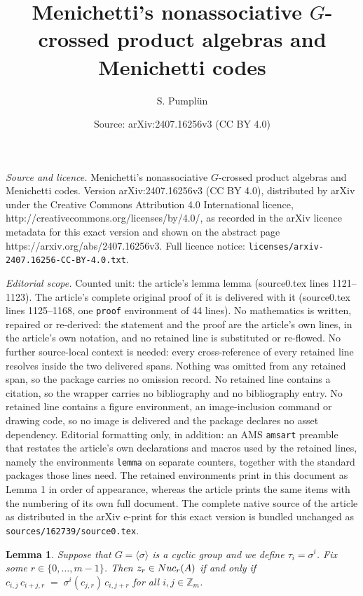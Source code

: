 \documentclass[10pt,a4paper]{amsart}
\title{Menichetti's nonassociative $G$-crossed product algebras and Menichetti codes}
\author{S. Pumpl\"un}
\date{Source: arXiv:2407.16256v3 (CC BY 4.0)}
\newtheorem{lemma}{Lemma}
\begin{document}
\maketitle

\noindent\emph{Source and licence.} Menichetti's nonassociative $G$-crossed product algebras and Menichetti codes. Version arXiv:2407.16256v3 (CC BY 4.0), distributed by arXiv under the Creative Commons Attribution 4.0 International licence, http://creativecommons.org/licenses/by/4.0/, as recorded in the arXiv licence metadata for this exact version and shown on the abstract page https://arxiv.org/abs/2407.16256v3. Full licence notice: \texttt{licenses/arxiv-2407.16256-CC-BY-4.0.txt}.\par\smallskip

\noindent\textit{Editorial scope.} Counted unit: the article's lemma lemma (source0.tex lines 1121--1123). The article's complete original proof of it is delivered with it (source0.tex lines 1125--1168, one \texttt{proof} environment of 44 lines). No mathematics is written, repaired or re-derived: the statement and the proof are the article's own lines, in the article's own notation, and no retained line is substituted or re-flowed.  No further source-local context is needed: every cross-reference of every retained line resolves inside the two delivered spans.  Nothing was omitted from any retained span, so the package carries no omission record.  No retained line contains a citation, so the wrapper carries no bibliography and no bibliography entry.  No retained line contains a figure environment, an image-inclusion command or drawing code, so no image is delivered and the package declares no asset dependency.  Editorial formatting only, in addition: an AMS \texttt{amsart} preamble that restates the article's own declarations and macros used by the retained lines, namely the environments \texttt{lemma} on separate counters, together with the standard packages those lines need.  The retained environments print in this document as Lemma 1 in order of appearance, whereas the article prints the same items with the numbering of its own full document.  The complete native source of the article as distributed in the arXiv e-print for this exact version is bundled unchanged as \texttt{sources/162739/source0.tex}.
\begin{lemma} Suppose that $G=\langle \sigma\rangle$ is a cyclic group and we define $\tau_i=\sigma^i$.
Fix some  $r\in \{0,\dots,m-1\}$. Then $z_r\in {\rm Nuc}_r(A)$ if and only if $c_{i,j}\,c_{i+j,r} \;=\; \sigma^{i}(c_{j,r})\,c_{i,j+r}$ for all $i,j\in \mathbb{Z}_m$.
\end{lemma}
\end{document}
